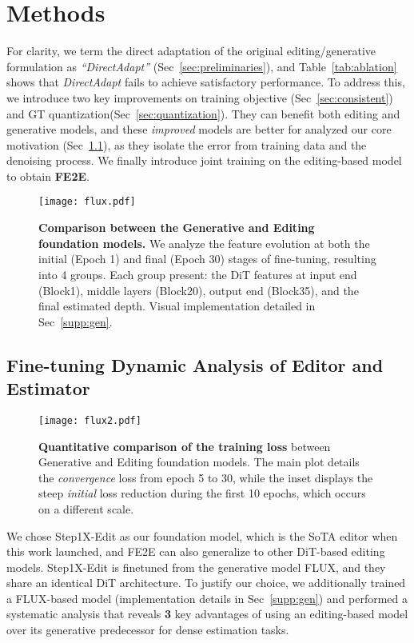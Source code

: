 \documentclass{article} %
\begin{document}
\section{Methods}
\vspace{-0.5em}
For clarity, we term the direct adaptation of the original editing/generative formulation as \textit{``DirectAdapt''} (Sec~\ref{sec:preliminaries}), and Table~\ref{tab:ablation} shows that \textit{DirectAdapt} fails to achieve satisfactory performance. To address this, we introduce two key improvements on training objective (Sec~\ref{sec:consistent}) and GT quantization(Sec~\ref{sec:quantization}). They can benefit both editing and generative models, and these \textit{improved} models are better for analyzed our core motivation (Sec~\ref{sec:analysis}), as they isolate the error from training data and the denoising process. We finally introduce joint training on the editing-based model to obtain \textbf{FE2E}.
\begin{figure}[!t]  
  \centering
  \vspace{-2em}
  \texttt{[image: flux.pdf]}
  \vspace{-2em}
  \caption{
    \textbf{Comparison between the Generative and Editing foundation models.} We analyze the feature evolution at both the initial (Epoch 1) and final (Epoch 30) stages of fine-tuning, resulting into 4 groups. Each group present: the DiT features at input end (Block1), middle layers (Block20), output end (Block35), and the final estimated depth. Visual implementation detailed in Sec~\ref{supp:gen}.
}
  \label{fig:flux}
  \vspace{-1.5em}
\end{figure}
\vspace{-1em}
\subsection{Fine-tuning Dynamic Analysis of Editor and Estimator}
\label{sec:analysis}
\begin{wrapfigure}{r}{0.5\textwidth}
  \vspace{-1em}
  \centering
  \texttt{[image: flux2.pdf]}
  \vspace{-2em}
  \caption{\textbf{Quantitative comparison of the training loss} between Generative and Editing foundation models. The main plot details the \textit{convergence} loss from epoch 5 to 30, while the inset displays the steep \textit{initial} loss reduction during the first 10 epochs, which occurs on a different scale.}
  \vspace{-2em}
  \label{fig:flux2}
\end{wrapfigure}
We chose Step1X-Edit as our foundation model, which is the SoTA editor when this work launched, and FE2E can also generalize to other DiT-based editing models. Step1X-Edit is finetuned from the generative model FLUX, and they share an identical DiT architecture. To justify our choice, we additionally trained a FLUX-based model (implementation details in Sec~\ref{supp:gen}) and performed a systematic analysis that reveals \textbf{3} key advantages of using an editing-based model over its generative predecessor for dense estimation tasks.
\end{document}
